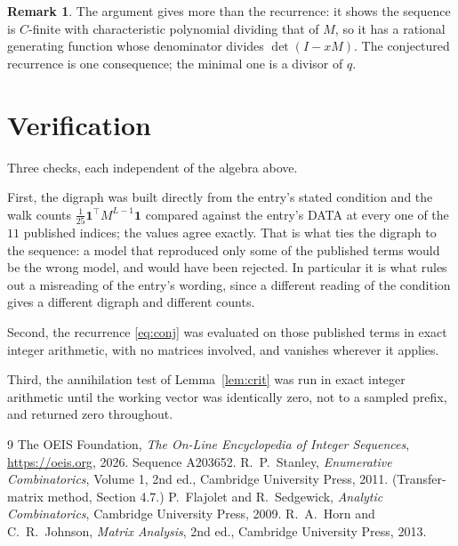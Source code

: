 \documentclass[11pt,a4paper]{article}
\theoremstyle{plain}
\theoremstyle{definition}
\newtheorem{remark}[theorem]{Remark}
\begin{document}
\begin{remark}
The argument gives more than the recurrence: it shows the sequence is $C$-finite with
characteristic polynomial dividing that of $M$, so it has a rational generating function
whose denominator divides $\det(I-xM)$. The conjectured recurrence is one consequence; the
minimal one is a divisor of $q$.
\end{remark}

\section{Verification}

Three checks, each independent of the algebra above.

First, the digraph was built directly from the entry's stated condition and the walk counts
$\tfrac1{25}\mathbf{1}^{\!\top}M^{L-1}\mathbf{1}$ compared against the entry's DATA at
every one of the $11$ published indices; the values agree exactly. That is what ties
the digraph to the sequence: a model that reproduced only some of the published terms would
be the wrong model, and would have been rejected. In particular it is what rules out a
misreading of the entry's wording, since a different reading of the condition gives a
different digraph and different counts.

Second, the recurrence \eqref{eq:conj} was evaluated on those published terms in exact
integer arithmetic, with no matrices involved, and vanishes wherever it applies.

Third, the annihilation test of Lemma~\ref{lem:crit} was run in exact integer arithmetic
until the working vector was identically zero, not to a sampled prefix, and returned zero
throughout.

\begin{thebibliography}{9}
 The OEIS Foundation, \emph{The On-Line Encyclopedia of Integer
Sequences}, \url{https://oeis.org}, 2026. Sequence A203652.
 R.~P.~Stanley, \emph{Enumerative Combinatorics}, Volume 1, 2nd ed.,
Cambridge University Press, 2011. (Transfer-matrix method, Section 4.7.)
 P.~Flajolet and R.~Sedgewick, \emph{Analytic Combinatorics}, Cambridge
University Press, 2009.
 R.~A.~Horn and C.~R.~Johnson, \emph{Matrix Analysis}, 2nd ed., Cambridge
University Press, 2013.
\end{thebibliography}
\end{document}
